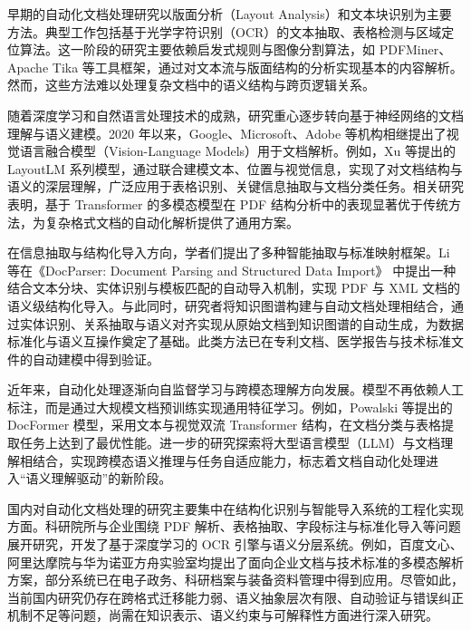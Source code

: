 早期的自动化文档处理研究以版面分析（Layout Analysis）和文本块识别为主要方法。典型工作包括基于光学字符识别（OCR）的文本抽取、表格检测与区域定位算法。这一阶段的研究主要依赖启发式规则与图像分割算法，如 PDFMiner、Apache Tika 等工具框架，通过对文本流与版面结构的分析实现基本的内容解析。然而，这些方法难以处理复杂文档中的语义结构与跨页逻辑关系。

随着深度学习和自然语言处理技术的成熟，研究重心逐步转向基于神经网络的文档理解与语义建模。2020 年以来，Google、Microsoft、Adobe 等机构相继提出了视觉语言融合模型（Vision-Language Models）用于文档解析。例如，Xu 等提出的 LayoutLM 系列模型\cite{Xu2020LayoutLM,Xu2022LayoutLMv3}，通过联合建模文本、位置与视觉信息，实现了对文档结构与语义的深层理解，广泛应用于表格识别、关键信息抽取与文档分类任务。相关研究表明，基于 Transformer 的多模态模型在 PDF 结构分析中的表现显著优于传统方法，为复杂格式文档的自动化解析提供了通用方案。

在信息抽取与结构化导入方向，学者们提出了多种智能抽取与标准映射框架。Li 等在《DocParser: Document Parsing and Structured Data Import》\cite{Li2021DocParser} 中提出一种结合文本分块、实体识别与模板匹配的自动导入机制，实现 PDF 与 XML 文档的语义级结构化导入。与此同时，研究者将知识图谱构建与自动文档处理相结合，通过实体识别、关系抽取与语义对齐实现从原始文档到知识图谱的自动生成，为数据标准化与语义互操作奠定了基础。此类方法已在专利文档、医学报告与技术标准文件的自动建模中得到验证。

近年来，自动化处理逐渐向自监督学习与跨模态理解方向发展。模型不再依赖人工标注，而是通过大规模文档预训练实现通用特征学习。例如，Powalski 等提出的 DocFormer 模型\cite{Powalski2021DocFormer}，采用文本与视觉双流 Transformer 结构，在文档分类与表格提取任务上达到了最优性能。进一步的研究探索将大型语言模型（LLM）与文档理解相结合，实现跨模态语义推理与任务自适应能力\cite{Wang2023DocumentLLM}，标志着文档自动化处理进入“语义理解驱动”的新阶段。

国内对自动化文档处理的研究主要集中在结构化识别与智能导入系统的工程化实现方面。科研院所与企业围绕 PDF 解析、表格抽取、字段标注与标准化导入等问题展开研究，开发了基于深度学习的 OCR 引擎与语义分层系统。例如，百度文心、阿里达摩院与华为诺亚方舟实验室均提出了面向企业文档与技术标准的多模态解析方案，部分系统已在电子政务、科研档案与装备资料管理中得到应用。尽管如此，当前国内研究仍存在跨格式迁移能力弱、语义抽象层次有限、自动验证与错误纠正机制不足等问题，尚需在知识表示、语义约束与可解释性方面进行深入研究。

